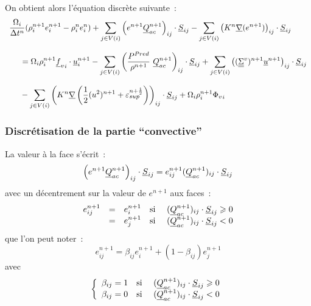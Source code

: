 On obtient alors l'\'equation discr\`ete
suivante~:
\begin{equation}\label{Cfbl_Cfener_eq_energie_totale_discrete_cfener}
\begin{array}{l}
\displaystyle\frac{\Omega_i}{\Delta t^n}
(\rho_i^{n+1} e_i^{n+1}-\rho_i^n e_i^n)
+ \displaystyle\sum\limits_{j\in V(i)}
\left(e^{n+1} \underline{Q}_{ac}^{n+1}\right)_{ij} \cdot \underline{S}_{ij}
- \displaystyle\sum\limits_{j\in V(i)}
\left(K^n\underline{\nabla}(e^{n+1})\right)_{ij}\cdot\underline{S}_{ij}\\
\\
\text{\ \ \ \ } = \Omega_i\rho_i^{n+1} {\underline{f}_v}_i \cdot \underline{u}_i^{n+1}
- \displaystyle\sum\limits_{j\in V(i)}
\left(\displaystyle\frac{P^{Pred}}{\rho^{n+1}}\
\underline{Q}_{ac}^{n+1}\right)_{ij} \cdot \underline{S}_{ij}
+ \displaystyle\sum\limits_{j\in V(i)}
\left((\underline{\underline{\Sigma}}^v)^{n+1} \underline{u}^{n+1} \right)_{ij}\cdot \underline{S}_{ij}\\
\\
\text{\ \ \ \ } - \displaystyle\sum\limits_{j\in V(i)}
\left(K^n \underline{\nabla}\left(\frac{1}{2}(u^2)^{n+1}
+ \varepsilon_{sup}^{n+\frac{1}{2}}\right)\right)_{ij}\cdot\underline{S}_{ij}
+ \Omega_i\rho_i^{n+1}{\Phi_v}_i\\
\end{array}
\end{equation}


\subsubsection*{Discr\'etisation de la partie ``convective''}

La valeur \`a la face s'\'ecrit~:
\begin{equation}
\left(e^{n+1} \underline{Q}_{ac}^{n+1}\right)_{ij} \cdot \underline{S}_{ij}
= e_{ij}^{n+1}(\underline{Q}_{ac}^{n+1})_{ij} \cdot \underline{S}_{ij}
\end{equation}
avec un d\'ecentrement sur la valeur de $e^{n+1}$ aux faces~:
\begin{equation}
\begin{array}{lllll}
e_{ij}^{n+1}
& = & e_i^{n+1}
& \text{si\ } & (\underline{Q}_{ac}^{n+1})_{ij} \cdot \underline{S}_{ij} \geqslant 0 \\
& = & e_j^{n+1}
& \text{si\ } & (\underline{Q}_{ac}^{n+1})_{ij} \cdot \underline{S}_{ij} < 0 \\
\end{array}
\end{equation}
que l'on peut noter~:
\begin{equation}
 e_{ij}^{n+1}
 = \beta_{ij}e_i^{n+1} + (1-\beta_{ij})e_j^{n+1}
\end{equation}
avec
\begin{equation}
\left\{\begin{array}{lll}
\beta_{ij} = 1 & \text{si\ }
& (\underline{Q}_{ac}^{n+1})_{ij} \cdot \underline{S}_{ij} \geqslant 0 \\
\beta_{ij} = 0 & \text{si\ }
& (\underline{Q}_{ac}^{n+1})_{ij} \cdot \underline{S}_{ij} < 0 \\
\end{array}\right.
\end{equation}


